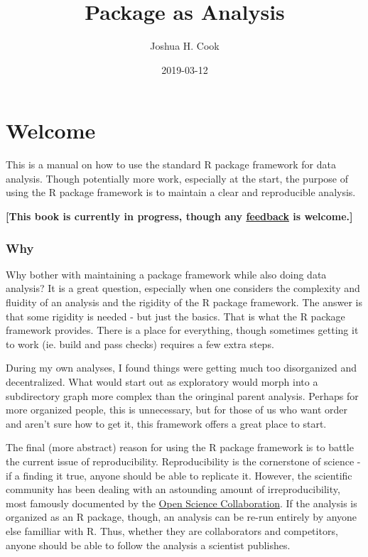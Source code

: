 \documentclass[]{book}
\title{Package as Analysis}
\author{Joshua H. Cook}
\date{2019-03-12}
\begin{document}
\maketitle

{
\setcounter{tocdepth}{1}
\tableofcontents
}
\chapter*{Welcome}\label{welcome}

This is a manual on how to use the standard R package framework for data
analysis. Though potentially more work, especially at the start, the
purpose of using the R package framework is to maintain a clear and
reproducible analysis.

\textbf{{[}This book is currently in progress, though any
\href{https://github.com/jhrcook/package-as-analysis/issues}{feedback}
is welcome.{]}}

\subsection*{Why}\label{why}

Why bother with maintaining a package framework while also doing data
analysis? It is a great question, especially when one considers the
complexity and fluidity of an analysis and the rigidity of the R package
framework. The answer is that some rigidity is needed - but just the
basics. That is what the R package framework provides. There is a place
for everything, though sometimes getting it to work (ie. build and pass
checks) requires a few extra steps.

During my own analyses, I found things were getting much too
disorganized and decentralized. What would start out as exploratory
would morph into a subdirectory graph more complex than the oringinal
parent analysis. Perhaps for more organized people, this is unnecessary,
but for those of us who want order and aren't sure how to get it, this
framework offers a great place to start.

The final (more abstract) reason for using the R package framework is to
battle the current issue of reproducibility. Reproducibility is the
cornerstone of science - if a finding it true, anyone should be able to
replicate it. However, the scientific community has been dealing with an
astounding amount of irreproducibility, most famously documented by the
\href{http://science.sciencemag.org/content/349/6251/aac4716}{Open
Science Collaboration}. If the analysis is organized as an R package,
though, an analysis can be re-run entirely by anyone else familliar with
R. Thus, whether they are collaborators and competitors, anyone should
be able to follow the analysis a scientist publishes.
\end{document}

